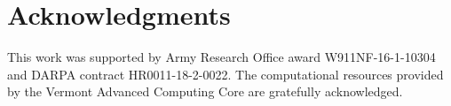 \section*{Acknowledgments}


This work was supported by 
Army Research Office award W911NF-16-1-10304
and DARPA contract HR0011-18-2-0022. 
The computational resources provided by the 
Vermont Advanced Computing Core 
are gratefully acknowledged.

